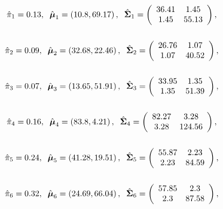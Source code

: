 \[
\begin{array}{l@{\hskip 0.1in}l@{\hskip 0.1in}c }
\hat{\pi}_1 = 0.13, & \hat{\m\mu}_1 = \left(10.8,69.17\right), & \hat{\m\Sigma}_1 = \left(
\begin{array}{cc}
36.41&1.45 \\ 
1.45&55.13 \\ 
\end{array}
\right), \\ & &\\ 
\end{array}
\]
\[
\begin{array}{l@{\hskip 0.1in}l@{\hskip 0.1in}c }
\hat{\pi}_2 = 0.09, & \hat{\m\mu}_2 = \left(32.68,22.46\right), & \hat{\m\Sigma}_2 = \left(
\begin{array}{cc}
26.76&1.07 \\ 
1.07&40.52 \\ 
\end{array}
\right), \\ & &\\ 
\end{array}
\]
\[
\begin{array}{l@{\hskip 0.1in}l@{\hskip 0.1in}c }
\hat{\pi}_3 = 0.07, & \hat{\m\mu}_3 = \left(13.65,51.91\right), & \hat{\m\Sigma}_3 = \left(
\begin{array}{cc}
33.95&1.35 \\ 
1.35&51.39 \\ 
\end{array}
\right), \\ & &\\ 
\end{array}
\]
\[
\begin{array}{l@{\hskip 0.1in}l@{\hskip 0.1in}c }
\hat{\pi}_4 = 0.16, & \hat{\m\mu}_4 = \left(83.8,4.21\right), & \hat{\m\Sigma}_4 = \left(
\begin{array}{cc}
82.27&3.28 \\ 
3.28&124.56 \\ 
\end{array}
\right), \\ & &\\ 
\end{array}
\]
\[
\begin{array}{l@{\hskip 0.1in}l@{\hskip 0.1in}c }
\hat{\pi}_5 = 0.24, & \hat{\m\mu}_5 = \left(41.28,19.51\right), & \hat{\m\Sigma}_5 = \left(
\begin{array}{cc}
55.87&2.23 \\ 
2.23&84.59 \\ 
\end{array}
\right), \\ & &\\ 
\end{array}
\]
\[
\begin{array}{l@{\hskip 0.1in}l@{\hskip 0.1in}c }
\hat{\pi}_6 = 0.32, & \hat{\m\mu}_6 = \left(24.69,66.04\right), & \hat{\m\Sigma}_6 = \left(
\begin{array}{cc}
57.85&2.3 \\ 
2.3&87.58 \\ 
\end{array}
\right), \\ & &\\ 
\end{array}
\]

